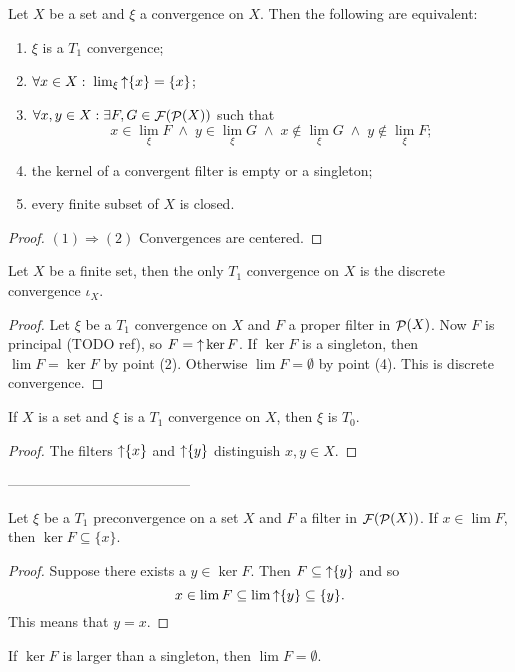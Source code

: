 \begin{proposition}
Let $X$ be a set and $\xi$ a convergence on $X$. Then the following are equivalent:
\begin{enumerate}
\item $\xi$ is a $T_1$ convergence;
\item $\forall x\in X: \; \lim_\xi\mathop{\uparrow}\{x\} = \{x\}$;
\item $\forall x,y\in X: \exists F,G\in \mathop{\mathcal{F}}(\mathop{\mathcal{P}}(X))$ such that
\[ x\in \lim_\xi F \;\land\; y\in \lim_\xi G \;\land\; x\notin \lim_\xi G \;\land\; y\notin \lim_\xi F; \]
\item the kernel of a convergent filter is empty or a singleton;
\item every finite subset of $X$ is closed.
\end{enumerate}
\end{proposition}
\begin{proof}
$(1) \Rightarrow (2)$ Convergences are centered.


\end{proof}
\begin{corollary} \label{finiteConvergenceDiscrete}
Let $X$ be a finite set, then the only $T_1$ convergence on $X$ is the discrete convergence $\iota_X$.
\end{corollary}
\begin{proof}
Let $\xi$ be a $T_1$ convergence on $X$ and $F$ a proper filter in $\mathop{\mathcal{P}}(X)$. Now $F$ is principal (TODO ref), so $F = \mathop{\uparrow} \ker F$. If $\ker F$ is a singleton, then $\lim F = \ker F$ by point (2). Otherwise $\lim F = \emptyset$ by point (4). This is discrete convergence.
\end{proof}

\begin{lemma}
If $X$ is a set and $\xi$ is a $T_1$ convergence on $X$, then $\xi$ is $T_0$.
\end{lemma}
\begin{proof}
The filters $\mathop{\uparrow}\{x\}$ and $\mathop{\uparrow}\{y\}$ distinguish $x,y\in X$.
\end{proof}

---------------------------------------

\begin{proposition}
Let $\xi$ be a $T_1$ preconvergence on a set $X$ and $F$ a filter in $\mathop{\mathcal{F}}(\mathop{\mathcal{P}}(X))$. If $x\in \lim F$, then $\ker F \subseteq \{x\}$.
\end{proposition}
\begin{proof}
Suppose there exists a $y \in \ker F$. Then $F \subseteq \mathop{\uparrow} \{y\}$ and so
\[ x \in \lim F \subseteq \lim \mathop{\uparrow}\{y\} \subseteq \{y\}. \]
This means that $y = x$.
\end{proof}
\begin{corollary}
If $\ker F$ is larger than a singleton, then $\lim F = \emptyset$.
\end{corollary}




